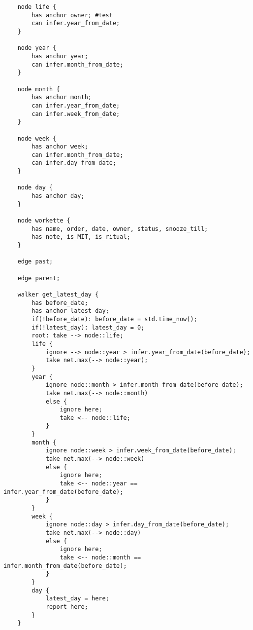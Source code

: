 \begin{lstlisting}
    node life {
        has anchor owner; #test
        can infer.year_from_date;
    }

    node year {
        has anchor year;
        can infer.month_from_date;
    }

    node month {
        has anchor month;
        can infer.year_from_date;
        can infer.week_from_date;
    }

    node week {
        has anchor week;
        can infer.month_from_date;
        can infer.day_from_date;
    }

    node day {
        has anchor day;
    }

    node workette {
        has name, order, date, owner, status, snooze_till;
        has note, is_MIT, is_ritual;
    }

    edge past;

    edge parent;

    walker get_latest_day {
        has before_date;
        has anchor latest_day;
        if(!before_date): before_date = std.time_now();
        if(!latest_day): latest_day = 0;
        root: take --> node::life;
        life {
            ignore --> node::year > infer.year_from_date(before_date);
            take net.max(--> node::year);
        }
        year {
            ignore node::month > infer.month_from_date(before_date);
            take net.max(--> node::month)
            else {
                ignore here;
                take <-- node::life;
            }
        }
        month {
            ignore node::week > infer.week_from_date(before_date);
            take net.max(--> node::week)
            else {
                ignore here;
                take <-- node::year == infer.year_from_date(before_date);
            }
        }
        week {
            ignore node::day > infer.day_from_date(before_date);
            take net.max(--> node::day)
            else {
                ignore here;
                take <-- node::month == infer.month_from_date(before_date);
            }
        }
        day {
            latest_day = here;
            report here;
        }
    }


\end{lstlisting}
